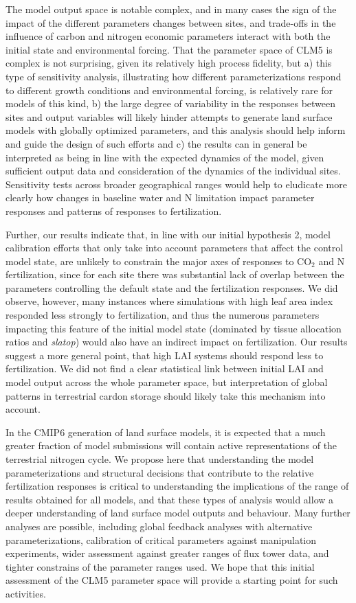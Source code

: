 \documentclass[draft,linenumbers]{agujournal}
\begin{document}
The model output space is notable complex, and in many cases the sign of the impact of the different parameters changes between sites, and trade-offs in the influence of carbon and nitrogen economic parameters interact with both the initial state and environmental forcing. That the parameter space of CLM5 is complex is not surprising, given its relatively high process fidelity, but a) this type of sensitivity analysis,  illustrating how different parameterizations respond to different growth conditions and environmental forcing, is relatively rare for models of this kind,  b) the large degree of variability in the responses between sites and output variables will likely hinder attempts to generate land surface models with globally optimized parameters, and this analysis should help inform and guide the design of such efforts and c) the results can in general be interpreted as being in line with the expected dynamics of the model, given sufficient output data and consideration of the dynamics of the individual sites. Sensitivity tests across broader geographical ranges would help to eludicate more clearly how changes in baseline water and N limitation impact parameter responses and patterns of responses to fertilization.

Further, our results indicate that, in line with our initial hypothesis 2, model calibration efforts that only take into account parameters that affect the control model state, are unlikely to constrain the major axes of responses to CO$_{2}$ and N fertilization, since for each site there was substantial lack of overlap between the parameters controlling the default state and the fertilization responses.  We did observe, however, many instances where simulations with high leaf area index responded less strongly to fertilization, and thus the numerous parameters impacting this feature of the initial model state (dominated by tissue allocation ratios and \emph{slatop}) would also have an indirect impact on fertilization.  Our results suggest a more general point, that high LAI systems should respond less to fertilization. We did not find a clear statistical link between initial LAI and model output across the whole parameter space, but interpretation of global patterns in terrestrial cardon storage should likely take this mechanism into account. 

In the CMIP6 generation of land surface models, it is expected that a much greater fraction of model submissions will contain active representations of the terrestrial nitrogen cycle. We propose here that understanding the model parameterizations and structural decisions that contribute to the relative fertilization responses is critical to understanding the implications of the range of results obtained for all models, and that these types of analysis would allow a deeper understanding of land surface model outputs and behaviour. Many further analyses are possible, including global feedback analyses with alternative parameterizations, calibration of critical parameters against manipulation experiments, wider assessment against greater ranges of flux tower data, and tighter constrains of the parameter ranges used. We hope that this initial assessment of the CLM5 parameter space will provide a starting point for such activities. 
\end{document}
